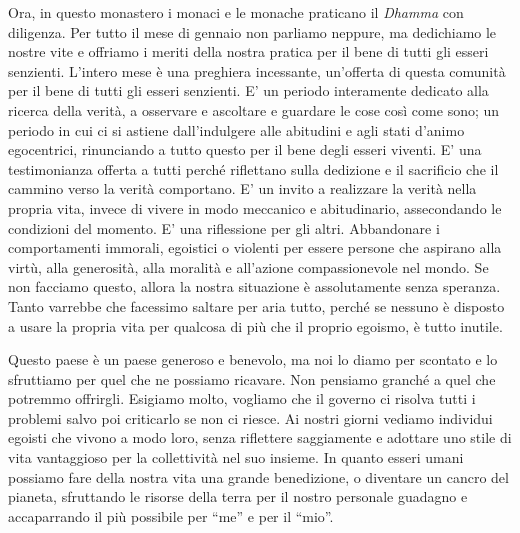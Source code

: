Ora, in questo monastero i monaci e le monache praticano il \textit{Dhamma} con
diligenza. Per tutto il mese di gennaio non parliamo neppure, ma
dedichiamo le nostre vite e offriamo i meriti della nostra pratica per
il bene di tutti gli esseri senzienti. L'intero mese è una preghiera
incessante, un'offerta di questa comunità per il bene di tutti gli
esseri senzienti. E' un periodo interamente dedicato alla ricerca della
verità, a osservare e ascoltare e guardare le cose così come sono; un
periodo in cui ci si astiene dall'indulgere alle abitudini e agli stati
d'animo egocentrici, rinunciando a tutto questo per il bene degli esseri
viventi. E' una testimonianza offerta a tutti perché riflettano sulla
dedizione e il sacrificio che il cammino verso la verità comportano. E'
un invito a realizzare la verità nella propria vita, invece di vivere in
modo meccanico e abitudinario, assecondando le condizioni del momento.
E' una riflessione per gli altri. Abbandonare i comportamenti immorali,
egoistici o violenti per essere persone che aspirano alla virtù, alla
generosità, alla moralità e all'azione compassionevole nel mondo. Se non
facciamo questo, allora la nostra situazione è assolutamente senza
speranza. Tanto varrebbe che facessimo saltare per aria tutto, perché se
nessuno è disposto a usare la propria vita per qualcosa di più che il
proprio egoismo, è tutto inutile.

Questo paese è un paese generoso e benevolo, ma noi lo diamo per
scontato e lo sfruttiamo per quel che ne possiamo ricavare. Non pensiamo
granché a quel che potremmo offrirgli. Esigiamo molto, vogliamo che il
governo ci risolva tutti i problemi salvo poi criticarlo se non ci
riesce. Ai nostri giorni vediamo individui egoisti che vivono a modo
loro, senza riflettere saggiamente e adottare uno stile di vita
vantaggioso per la collettività nel suo insieme. In quanto esseri umani
possiamo fare della nostra vita una grande benedizione, o diventare un
cancro del pianeta, sfruttando le risorse della terra per il nostro
personale guadagno e accaparrando il più possibile per ``me'' e per il
``mio''.

